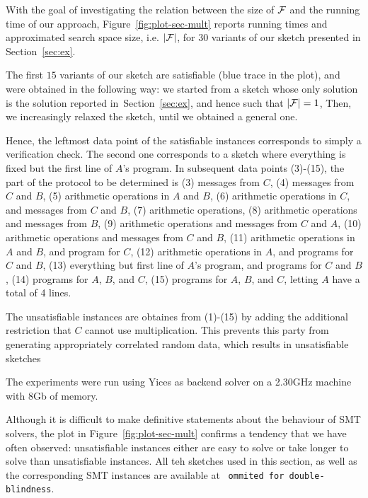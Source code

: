 \documentclass[preprint]{sig-alternate-05-2015}
\begin{document}
With the goal of investigating the 
relation between the size of ${\cal F}$
and the running time of our approach, 
Figure~\ref{fig:plot-sec-mult} reports 
running times and approximated
search space size, i.e. $|{\cal F}|$,
for $30$ variants of our sketch presented in 
Section~\ref{sec:ex}.

The first $15$ variants of our sketch are satisfiable 
(blue trace in the plot),
and were obtained in the following way:
we started from a sketch whose only solution 
is the solution reported in~Section~\ref{sec:ex},
and hence such that $|{\cal F}| = 1$,
Then, we increasingly relaxed the sketch,
until we obtained a general one.

Hence, the leftmost data point of the satisfiable instances corresponds to 
simply a verification check.
The second one corresponds to a sketch 
where everything is fixed but
the first line of $A$'s program.
In subsequent data points (3)-(15), the part of the protocol to be determined
is (3) messages from $C$,
(4) messages from $C$ and $B$,
(5) arithmetic operations in $A$ and $B$,
(6) arithmetic operations in $C$, and messages from $C$ and $B$,
(7) arithmetic operations,
(8) arithmetic operations and messages from $B$,
(9) arithmetic operations and messages from $C$ and $A$,
(10) arithmetic operations and messages from $C$ and $B$,
(11) arithmetic operations in $A$ and $B$, and program for $C$,
(12) arithmetic operations in $A$, and programs for $C$ and $B$,
(13) everything but first line of $A$'s program, and programs for $C$ and $B$,
(14) programs for $A$, $B$, and $C$,
(15) programs for $A$, $B$, and $C$, letting $A$ have a total of 4 lines.

The unsatisfiable instances are obtaines from (1)-(15) by adding the additional
restriction that $C$ cannot use multiplication. This prevents this
party from generating appropriately correlated random data,
which results in unsatisfiable sketches

The experiments were run using Yices as backend solver
on a 2.30GHz machine with 8Gb of memory.

Although it is difficult to make definitive statements 
about the behaviour of SMT solvers, the plot in
Figure~\ref{fig:plot-sec-mult}
confirms a tendency that we have often observed:
unsatisfiable instances 
either are easy to solve or
take longer to solve than unsatisfiable instances.
All teh sketches used in this section, as well as the 
corresponding SMT instances are available at
~\texttt{ommited for double-blindness}.
\end{document}

